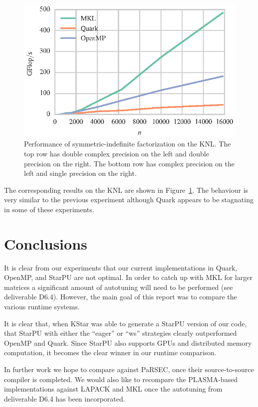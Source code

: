 \documentclass[a4paper,12pt]{article}
\begin{document}
\begin{figure}[t]
  \includegraphics[scale=.85]{fig/knl_ram_ssytrf_weak_scaling.eps}
  \caption{Performance of symmetric-indefinite factorization on the KNL.
    The top row has double complex precision on the left and double
    precision on the right.
    The bottom row has complex precision on the left and single
    precision on the right.}
  \label{fig.ldlt_knl_ram}
\end{figure}

The corresponding results on the KNL are shown in
Figure~\ref{fig.ldlt_knl_ram}.
The behaviour is very similar to the previous experiment
although Quark appears to be stagnating in some of these experiments.

\section{Conclusions}
\label{sec.conclusions}

It is clear from our experiments that our current implementations in
Quark, OpenMP, and StarPU are not optimal.
In order to catch up with MKL for larger matrices a significant amount
of autotuning will need to be performed (see deliverable D6.4).
However,
the main goal of this report was to compare the various runtime
systems.

It is clear that,
when KStar was able to generate a StarPU version of our code,
that StarPU with either the ``eager'' or ``ws'' strategies
clearly outperformed OpenMP and Quark.
Since StarPU also supports GPUs and distributed memory computation,
it becomes the clear winner in our runtime comparison.

In further work we hope to compare against PaRSEC,
once their source-to-source compiler is completed.
We would also like to recompare the PLASMA-based implementations
against LAPACK and MKL once the autotuning from deliverable D6.4
has been incorporated.




\end{document}
